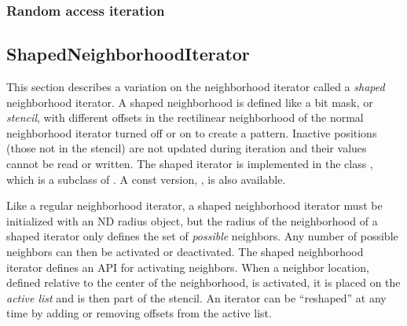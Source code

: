 {\subsubsection{Random access iteration}
\label{sec:NeighborhoodExample6}
%



\subsection{ShapedNeighborhoodIterator}
\label{sec:itkShapedNeighborhoodIterator}
This section describes a variation on the neighborhood iterator called a
\emph{shaped} neighborhood iterator.  A shaped neighborhood is defined like
a bit mask, or \emph{stencil}, with different offsets in the rectilinear
neighborhood of the normal neighborhood iterator turned off or on to create a
pattern.  Inactive positions (those not in the stencil) are not updated during
iteration and their values cannot be read or written.  The shaped iterator is
implemented in the class , which is a
subclass of
.  A const version,
, is also available.

Like a regular neighborhood iterator, a shaped neighborhood iterator must be
initialized with an ND radius object, but the radius of the neighborhood of a
shaped iterator only defines the set of \emph{possible} neighbors.  Any number
of possible neighbors can then be activated or deactivated.  The shaped
neighborhood iterator defines an API for activating neighbors.  When a neighbor
location, defined relative to the center of the neighborhood, is activated, it
is placed on the \emph{active list} and is then part of the stencil.  An
iterator can be ``reshaped'' at any time by adding or removing offsets from the
active list.

}
